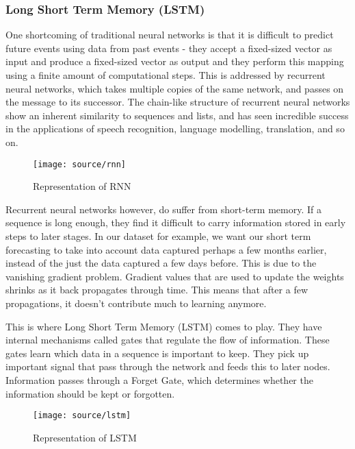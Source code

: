 \documentclass[12pt,twocolumn]{article}
\begin{document}
			\subsubsection*{Long Short Term Memory (LSTM)}
				\quad One shortcoming of traditional neural networks is that it is difficult to predict future events using data from past events - they accept a fixed-sized vector as input and produce a fixed-sized vector as output and they perform this mapping using a finite amount of computational steps. This is addressed by recurrent neural networks, which takes multiple copies of the same network, and passes on the message to its successor. The chain-like structure of recurrent neural networks show an inherent similarity to sequences and lists, and has seen incredible success in the applications of speech recognition, language modelling, translation, and so on. 

				\begin{figure}[!htbp]
					\centering
					\texttt{[image: source/rnn]}
					\caption{Representation of RNN}
				\end{figure}

				\quad Recurrent neural networks however, do suffer from short-term memory. If a sequence is long enough, they find it difficult to carry information stored in early steps to later stages. In our dataset for example, we want our short term forecasting to take into account data captured perhaps a few months earlier, instead of the just the data captured a few days before. This is due to the vanishing gradient problem. Gradient values that are used to update the weights shrinks as it back propagates through time. This means that after a few propagations, it doesn't contribute much to learning anymore. \newline

				\quad This is where Long Short Term Memory (LSTM) comes to play. They have internal mechanisms called gates that regulate the flow of information. These gates learn which data in a sequence is important to keep. They pick up important signal that pass through the network and feeds this to later nodes. Information passes through a Forget Gate, which determines whether the information should be kept or forgotten. 

				\begin{figure}[!htbp]
					\centering
					\texttt{[image: source/lstm]}
					\caption{Representation of LSTM}
				\end{figure}
\end{document}
